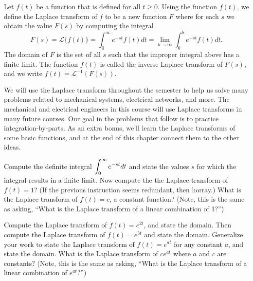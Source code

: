 \begin{definition}
Let $f(t)$ be a function that is defined for all $t\geq 0$.  
Using the function $f(t)$, we define the Laplace transform of $f$ to be a new function $F$ where for each $s$ we obtain the value $F(s)$ by computing the integral
$$F(s) = \mathscr{L}\{f(t)\}=\int_0^\infty e^{-st}f(t)dt = \lim_{b\to\infty} \int_0^b e^{-st}f(t)dt.$$
The domain of $F$ is the set of all $s$ such that the improper integral above has a finite limit. 
The function $f(t)$ is called the inverse Laplace transform of $F(s)$, and we write $f(t)=\mathscr{L}^{-1}(F(s))$.
\end{definition}

We will use the Laplace transform throughout the semester to help us solve many problems related to mechanical systems, electrical networks, and more. The mechanical and electrical engineers in this course will use Laplace transforms in many future courses. Our goal in the problems that follow is to practice integration-by-parts.  As an extra bonus, we'll learn the Laplace transforms of some basic functions, and at the end of this chapter connect them to the other ideas.


\begin{problem}
Compute the definite integral $\displaystyle\int_0^\infty e^{-st}dt$ and state the values $s$ for which the integral results in a finite limit. Now compute the the Laplace transform of $f(t)=1$? (If the previous instruction seems redundant, then horray.) What is the Laplace transform of $f(t) = c$, a constant function? (Note, this is the same as asking, ``What is the Laplace transform of a linear combination of 1?'')
\end{problem}


\begin{problem}
Compute the Laplace transform of $f(t)=e^{2t}$, and state the domain.  
Then compute the Laplace transform of $f(t)=e^{3t}$ and state the domain.
Generalize your work to state the Laplace transform of $f(t)=e^{at}$ for any constant $a$, and state the domain.  
What is the Laplace transform of $ce^{at}$ where $a$ and $c$ are constants?
(Note, this is the same as asking, ``What is the Laplace transform of a linear combination of $e^{at}$?'')
\end{problem}


